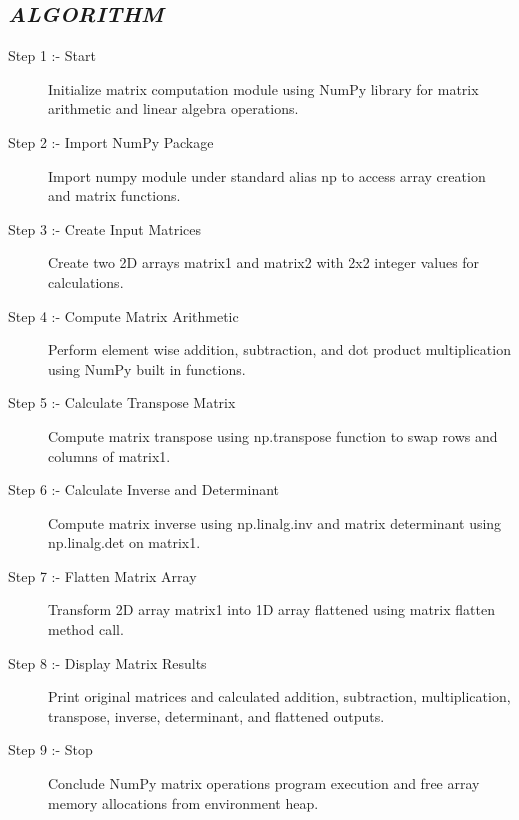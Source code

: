 \documentclass[11pt,a4paper]{article}
\begin{document}
\subsection*{\textit{ALGORITHM}}
\begin{description}
  \item[Step 1 :- Start] Initialize matrix computation module using NumPy library for matrix arithmetic and linear algebra operations.
  \item[Step 2 :- Import NumPy Package] Import numpy module under standard alias np to access array creation and matrix functions.
  \item[Step 3 :- Create Input Matrices] Create two 2D arrays matrix1 and matrix2 with 2x2 integer values for calculations.
  \item[Step 4 :- Compute Matrix Arithmetic] Perform element wise addition, subtraction, and dot product multiplication using NumPy built in functions.
  \item[Step 5 :- Calculate Transpose Matrix] Compute matrix transpose using np.transpose function to swap rows and columns of matrix1.
  \item[Step 6 :- Calculate Inverse and Determinant] Compute matrix inverse using np.linalg.inv and matrix determinant using np.linalg.det on matrix1.
  \item[Step 7 :- Flatten Matrix Array] Transform 2D array matrix1 into 1D array flattened using matrix flatten method call.
  \item[Step 8 :- Display Matrix Results] Print original matrices and calculated addition, subtraction, multiplication, transpose, inverse, determinant, and flattened outputs.
  \item[Step 9 :- Stop] Conclude NumPy matrix operations program execution and free array memory allocations from environment heap.
\end{description}
\end{document}
